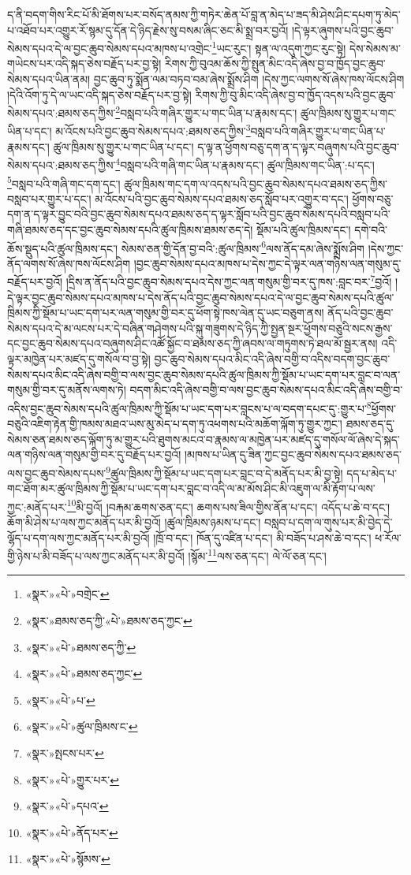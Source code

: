 ད་ནི་བདག་གིས་རིང་པོ་མི་ཐོགས་པར་བསོད་ནམས་ཀྱི་གཏེར་ཆེན་པོ་བླ་ན་མེད་པ་ཟད་མི་ཤེས་ཤིང་དཔག་ཏུ་མེད་པ་འཐོབ་པར་འགྱུར་རོ་སྙམ་དུ་དོན་དེ་ཉིད་རྗེས་སུ་བསམ་ཞིང་ཅང་མི་སྨྲ་བར་བྱའོ། །དེ་ལྟར་ཞུགས་པའི་བྱང་ཆུབ་སེམས་དཔའ་དེ་ལ་བྱང་ཆུབ་སེམས་དཔའ་མཁས་པ་འགྲེང་\footnote{«སྣར་»«པེ་»བགྲེང་}ཡང་རུང་། སྟན་ལ་འདུག་ཀྱང་རུང་སྟེ། དེས་སེམས་མ་གཡེངས་པར་འདི་སྐད་ཅེས་བརྗོད་པར་བྱ་སྟེ། རིགས་ཀྱི་བུའམ་ཆོས་ཀྱི་སྤུན་མིང་འདི་ཞེས་བྱ་བ་ཁྱོད་བྱང་ཆུབ་སེམས་དཔའ་ཡིན་ནམ། བྱང་ཆུབ་ཏུ་སྨོན་ལམ་བཏབ་བམ་ཞེས་སྨྲོས་ཤིག །དེས་ཀྱང་ལགས་སོ་ཞེས་ཁས་ལོངས་ཤིག །དེའི་འོག་ཏུ་དེ་ལ་ཡང་འདི་སྐད་ཅེས་བརྗོད་པར་བྱ་སྟེ། རིགས་ཀྱི་བུ་མིང་འདི་ཞེས་བྱ་བ་ཁྱོད་འདས་པའི་བྱང་ཆུབ་སེམས་དཔའ་:ཐམས་ཅད་ཀྱིས་\footnote{«སྣར་»ཐམས་ཅད་ཀྱི་«པེ་»ཐམས་ཅད་ཀྱང་}བསླབ་པའི་གཞིར་གྱུར་པ་གང་ཡིན་པ་རྣམས་དང་། ཚུལ་ཁྲིམས་སུ་གྱུར་པ་གང་ཡིན་པ་དང་། མ་འོངས་པའི་བྱང་ཆུབ་སེམས་དཔའ་:ཐམས་ཅད་ཀྱིས་\footnote{«སྣར་»«པེ་»ཐམས་ཅད་ཀྱི་}བསླབ་པའི་གཞིར་གྱུར་པ་གང་ཡིན་པ་རྣམས་དང་། ཚུལ་ཁྲིམས་སུ་གྱུར་པ་གང་ཡིན་པ་དང་། ད་ལྟ་ན་ཕྱོགས་བཅུ་དག་ན་ད་ལྟར་བཞུགས་པའི་བྱང་ཆུབ་སེམས་དཔའ་:ཐམས་ཅད་ཀྱིས་\footnote{«སྣར་»«པེ་»ཐམས་ཅད་ཀྱང་}བསླབ་པའི་གཞི་གང་ཡིན་པ་རྣམས་དང་། ཚུལ་ཁྲིམས་གང་ཡིན་:པ་དང་། \footnote{«སྣར་»«པེ་»པ་}བསླབ་པའི་གཞི་གང་དག་དང་། ཚུལ་ཁྲིམས་གང་དག་ལ་འདས་པའི་བྱང་ཆུབ་སེམས་དཔའ་ཐམས་ཅད་ཀྱིས་བསླབ་པར་གྱུར་པ་དང་། མ་འོངས་པའི་བྱང་ཆུབ་སེམས་དཔའ་ཐམས་ཅད་སློབ་པར་འགྱུར་བ་དང་། ཕྱོགས་བཅུ་དག་ན་ད་ལྟར་བྱུང་བའི་བྱང་ཆུབ་སེམས་དཔའ་ཐམས་ཅད་ད་ལྟར་སློབ་པའི་བྱང་ཆུབ་སེམས་དཔའི་བསླབ་པའི་གཞི་ཐམས་ཅད་དང་བྱང་ཆུབ་སེམས་དཔའི་ཚུལ་ཁྲིམས་ཐམས་ཅད་དེ། སྡོམ་པའི་ཚུལ་ཁྲིམས་དང་། དགེ་བའི་ཆོས་སྡུད་པའི་ཚུལ་ཁྲིམས་དང་། སེམས་ཅན་གྱི་དོན་བྱ་བའི་:ཚུལ་ཁྲིམས་\footnote{«སྣར་»«པེ་»ཚུལ་ཁྲིམས་ང་}ལས་ནོད་དམ་ཞེས་སྨྲོས་ཤིག །དེས་ཀྱང་ནོད་ལགས་སོ་ཞེས་ཁས་ལོངས་ཤིག །བྱང་ཆུབ་སེམས་དཔའ་མཁས་པ་དེས་ཀྱང་དེ་ལྟར་ལན་གཉིས་ལན་གསུམ་དུ་བརྗོད་པར་བྱའོ། །དྲིས་ན་ནོད་པའི་བྱང་ཆུབ་སེམས་དཔའ་དེས་ཀྱང་ལན་གསུམ་གྱི་བར་དུ་ཁས་:བླང་བར་\footnote{«སྣར་»སྤངས་པར་}བྱའོ། །དེ་ལྟར་བྱང་ཆུབ་སེམས་དཔའ་མཁས་པ་དེས་ནོད་པའི་བྱང་ཆུབ་སེམས་དཔའ་དེ་ལ་བྱང་ཆུབ་སེམས་དཔའི་ཚུལ་ཁྲིམས་ཀྱི་སྡོམ་པ་ཡང་དག་པར་ལན་གསུམ་གྱི་བར་དུ་ཕོག་སྟེ་ཁས་ལེན་དུ་ཡང་བཅུག་ནས། ནོད་པའི་བྱང་ཆུབ་སེམས་དཔའ་དེ་མ་ལངས་པར་དེ་བཞིན་གཤེགས་པའི་སྐུ་གཟུགས་དེ་ཉིད་ཀྱི་སྤྱན་སྔར་ཕྱོགས་བཅུའི་སངས་རྒྱས་དང་བྱང་ཆུབ་སེམས་དཔའ་བཞུགས་ཤིང་འཚོ་སྐྱོང་བ་ཐམས་ཅད་ཀྱི་ཞབས་ལ་གཏུགས་ཏེ་ཐལ་མོ་སྦྱར་ནས། འདི་ལྟར་མཁྱེན་པར་མཛད་དུ་གསོལ་བ་བྱ་སྟེ། བྱང་ཆུབ་སེམས་དཔའ་མིང་འདི་ཞེས་བགྱི་བ་འདིས་བདག་བྱང་ཆུབ་སེམས་དཔའ་མིང་འདི་ཞེས་བགྱི་བ་ལས་བྱང་ཆུབ་སེམས་དཔའི་ཚུལ་ཁྲིམས་ཀྱི་སྡོམ་པ་ཡང་དག་པར་བླང་བ་ལན་གསུམ་གྱི་བར་དུ་མནོས་ལགས་ཏེ། བདག་མིང་འདི་ཞེས་བགྱི་བ་ལས་བྱང་ཆུབ་སེམས་དཔའ་མིང་འདི་ཞེས་བགྱི་བ་འདིས་བྱང་ཆུབ་སེམས་དཔའི་ཚུལ་ཁྲིམས་ཀྱི་སྡོམ་པ་ཡང་དག་པར་བླངས་པ་ལ་བདག་དཔང་དུ་:གྱུར་པ་\footnote{«སྣར་»«པེ་»གྱུར་པར་}ཕྱོགས་བཅུའི་འཇིག་རྟེན་གྱི་ཁམས་མཐའ་ཡས་མུ་མེད་པ་དག་ཏུ་འཕགས་པའི་མཆོག་ལྐོག་ཏུ་གྱུར་ཀྱང་། ཐམས་ཅད་དུ་སེམས་ཅན་ཐམས་ཅད་ལྐོག་ཏུ་མ་གྱུར་པའི་ཐུགས་མངའ་བ་རྣམས་ལ་མཁྱེན་པར་མཛད་དུ་གསོལ་ལོ་ཞེས་དེ་སྐད་ལན་གཉིས་ལན་གསུམ་གྱི་བར་དུ་བརྗོད་པར་བྱའོ། །མཁས་པ་ཡིན་དུ་ཟིན་ཀྱང་བྱང་ཆུབ་སེམས་དཔའ་ཐམས་ཅད་ལས་བྱང་ཆུབ་སེམས་དཔས་\footnote{«སྣར་»«པེ་»དཔའ་}ཚུལ་ཁྲིམས་ཀྱི་སྡོམ་པ་ཡང་དག་པར་བླང་བ་དེ་མནོད་པར་མི་བྱ་སྟེ། དད་པ་མེད་པ་གང་ཐོག་མར་ཚུལ་ཁྲིམས་ཀྱི་སྡོམ་པ་ཡང་དག་པར་བླང་བ་འདི་ལ་མ་མོས་ཤིང་མི་འཇུག་ལ་མི་རྟོག་པ་ལས་ཀྱང་:མནོད་པར་\footnote{«སྣར་»«པེ་»ནོད་པར་}མི་བྱའོ། །བརྐམ་ཆགས་ཅན་དང་། ཆགས་པས་ཟིལ་གྱིས་ནོན་པ་དང་། འདོད་པ་ཆེ་བ་དང་། ཆོག་མི་ཤེས་པ་ལས་ཀྱང་མནོད་པར་མི་བྱའོ། །ཚུལ་ཁྲིམས་ཉམས་པ་དང་། བསླབ་པ་དག་ལ་གུས་པར་མི་བྱེད་དེ་ལྷོད་པ་དག་ལས་ཀྱང་མནོད་པར་མི་བྱའོ། །ཁྲོ་བ་དང་། ཁོན་དུ་འཛིན་པ་དང་། མི་བཟོད་པ་ཤས་ཆེ་བ་དང་། ཕ་རོལ་གྱི་ཉེས་པ་མི་བཟོད་པ་ལས་ཀྱང་མནོད་པར་མི་བྱའོ། །སྙོམ་\footnote{«སྣར་»«པེ་»སྙོམས་}ལས་ཅན་དང་། ལེ་ལོ་ཅན་དང་། 